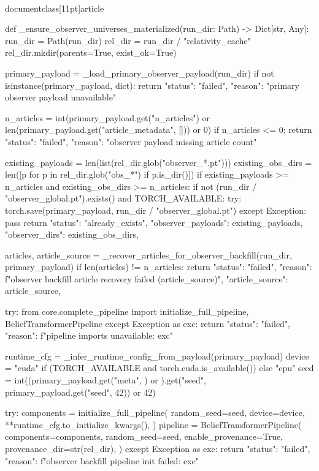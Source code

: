 \\documentclass[11pt]{article}
\begin{document}
\begin{CodeBlock}
def _ensure_observer_universes_materialized(run_dir: Path) -> Dict[str, Any]:
    run_dir = Path(run_dir)
    rel_dir = run_dir / "relativity_cache"
    rel_dir.mkdir(parents=True, exist_ok=True)

    primary_payload = _load_primary_observer_payload(run_dir)
    if not isinstance(primary_payload, dict):
        return {"status": "failed", "reason": "primary observer payload unavailable"}

    n_articles = int(primary_payload.get("n_articles") or len(primary_payload.get("article_metadata", [])) or 0)
    if n_articles <= 0:
        return {"status": "failed", "reason": "observer payload missing article count"}

    existing_payloads = len(list(rel_dir.glob("observer_*.pt")))
    existing_obs_dirs = len([p for p in rel_dir.glob("obs_*") if p.is_dir()])
    if existing_payloads >= n_articles and existing_obs_dirs >= n_articles:
        if not (run_dir / "observer_global.pt").exists() and TORCH_AVAILABLE:
            try:
                torch.save(primary_payload, run_dir / "observer_global.pt")
            except Exception:
                pass
        return {
            "status": "already_exists",
            "observer_payloads": existing_payloads,
            "observer_dirs": existing_obs_dirs,
        }

    articles, article_source = _recover_articles_for_observer_backfill(run_dir, primary_payload)
    if len(articles) != n_articles:
        return {
            "status": "failed",
            "reason": f"observer backfill article recovery failed ({article_source})",
            "article_source": article_source,
        }

    try:
        from core.complete_pipeline import initialize_full_pipeline, BeliefTransformerPipeline
    except Exception as exc:
        return {"status": "failed", "reason": f"pipeline imports unavailable: {exc}"}

    runtime_cfg = _infer_runtime_config_from_payload(primary_payload)
    device = "cuda" if (TORCH_AVAILABLE and torch.cuda.is_available()) else "cpu"
    seed = int((primary_payload.get("meta", {}) or {}).get("seed", primary_payload.get("seed", 42)) or 42)

    try:
        components = initialize_full_pipeline(
            random_seed=seed,
            device=device,
            **runtime_cfg.to_initialize_kwargs(),
        )
        pipeline = BeliefTransformerPipeline(
            components=components,
            random_seed=seed,
            enable_provenance=True,
            provenance_dir=str(rel_dir),
        )
    except Exception as exc:
        return {"status": "failed", "reason": f"observer backfill pipeline init failed: {exc}"}


\end{CodeBlock}
\end{document}
